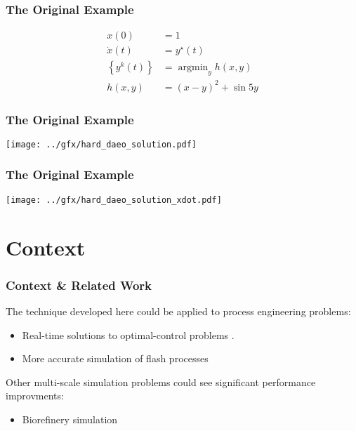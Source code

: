 \documentclass[10pt]{beamer}
\DeclareMathOperator*{\argmin}{\arg\min}
\begin{document}
\begin{frame}
	\frametitle{The Original Example}
	\begin{equation*}
		\begin{aligned}
			x(0) &= 1\\
			\dot x(t) &= y^\star(t)\\
			\left\{y^k(t)\right\} &= \argmin_{y} h(x, y)\\
			h(x, y) &= (x-y)^2 + \sin 5y
		\end{aligned}
	\end{equation*}
\end{frame}

\begin{frame}
	\frametitle{The Original Example}
	\begin{center}
		\texttt{[image: ../gfx/hard\_daeo\_solution.pdf]}
	\end{center}
\end{frame}

\begin{frame}
	\frametitle{The Original Example}
	\begin{center}
		\texttt{[image: ../gfx/hard\_daeo\_solution\_xdot.pdf]}
	\end{center}
\end{frame}

\section{Context}
\begin{frame}
	\frametitle{Context \& Related Work}
	\vfill
	The technique developed here could be applied to process engineering problems:
	\begin{itemize}
		\item Real-time solutions to optimal-control problems \cite{plochDirectSingleShooting2022}.
		\item More accurate simulation of flash processes \cite{ritschelAlgorithmGradientbasedDynamic2018}
	\end{itemize}
	\vfill
	Other multi-scale simulation problems could see significant performance improvments:
	\begin{itemize}
		\item Biorefinery simulation \cite{plochMultiscaleDynamicModeling2019}
	\end{itemize}
	\vfill
\end{frame}
\end{document}
